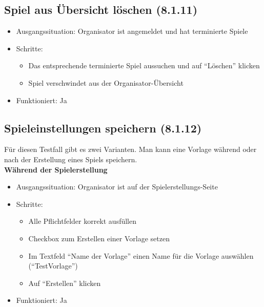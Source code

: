 \documentclass[a4paper]{scrreprt}
\begin{document}
            \subsection{Spiel aus Übersicht löschen (8.1.11)}
            \begin{itemize}
                \item Ausgangssituation: Organisator ist angemeldet und hat terminierte Spiele
                \item Schritte:
                    \begin{itemize}
                        \item Das entsprechende terminierte Spiel aussuchen und auf \enquote{Löschen} klicken
                        \item Spiel verschwindet aus der Organisator-Übersicht
                \end{itemize}
                \item Funktioniert: Ja
            \end{itemize}

            \subsection{Spieleinstellungen speichern (8.1.12)}
            Für diesen Testfall gibt es zwei Varianten. Man kann eine Vorlage während oder nach der Erstellung eines Spiels speichern. \\

            \textbf{Während der Spielerstellung}
            \begin{itemize}
                \item Ausgangssituation: Organisator ist auf der Spielerstellungs-Seite
                \item Schritte:
                    \begin{itemize}
                        \item Alle Pflichtfelder korrekt ausfüllen
                        \item Checkbox zum Erstellen einer Vorlage setzen
                        \item Im Textfeld \enquote{Name der Vorlage} einen Name für die Vorlage auswählen (\enquote{TestVorlage})
                        \item Auf \enquote{Erstellen} klicken
                    \end{itemize}
                \item Funktioniert: Ja
            \end{itemize}
\end{document}
